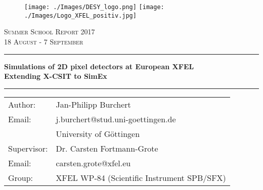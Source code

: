 \begin{titlepage}
\centering
\begin{figure}
 \centering
 \texttt{[image: ./Images/DESY\_logo.png]}
 \hfill
 \texttt{[image: ./Images/Logo\_XFEL\_positiv.jpg]}
\end{figure}
\textsc{{\Large Summer School Report 2017} \\
 {\large 18 August - 7 September} \\
}

  
\vspace*{1.0cm}
  
\rule{\textwidth}{1pt}
{\huge \bfseries
  	Simulations of 2D pixel detectors at European XFEL \\
  	\Large Extending X-CSIT to SimEx\\[1.5ex]}
\rule{\textwidth}{1pt}

\vspace*{8.0cm}
\onehalfspacing
\begin{tabular}{l l l l}
\multicolumn{2}{l}{Author:} 	&		\multicolumn{2}{l}{Jan-Philipp Burchert}  \\
\multicolumn{2}{l}{Email:} 	&		\multicolumn{2}{l}{j.burchert@stud.uni-goettingen.de}  \\
 &  &		\multicolumn{2}{l}{University of Göttingen}  \\
\multicolumn{2}{l}{Supervisor:	}	&	\multicolumn{2}{l}{Dr. Carsten Fortmann-Grote} \\
\multicolumn{2}{l}{Email:} 	&		\multicolumn{2}{l}{carsten.grote@xfel.eu}  \\
\multicolumn{2}{l}{Group:	}	&	\multicolumn{2}{l}{XFEL WP-84 (Scientific Instrument SPB/SFX)} \\
\end{tabular}

\end{titlepage}

\clearpage
\setlength{\hoffset}{0mm}